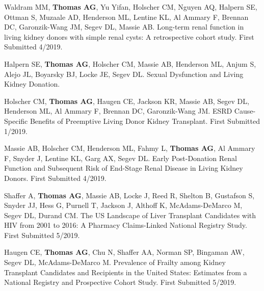 \documentclass[10pt]{article}
\renewcommand{\section}[1]{\pagebreak[3]%
    \vspace{1.3\baselineskip}%
    \phantomsection\addcontentsline{toc}{section}{#1}%
    \noindent\llap{\scshape\smash{\parbox[t]{\marginparwidth}{\hyphenpenalty=10000\raggedright #1}}}%
    \vspace{-\baselineskip}\par}
\begin{document}
\vspace{2mm}

\begin{bibenum}

\item Waldram MM\dag, \textbf{Thomas AG\dag}, Yu Yifan, Holscher CM,
  Nguyen AQ, Halpern SE, Ottman S, Muzaale AD, Henderson ML, Lentine KL,
  Al Ammary F, Brennan DC, Garonzik-Wang JM, Segev DL, Massie AB.
  Long-term renal function in living kidney donors with simple renal cysts:
  A retrospective cohort study.
  First Submitted 4/2019.

\item Halpern SE, \textbf{Thomas AG}, Holscher CM, Massie AB, Henderson ML,
  Anjum S, Alejo JL, Boyarsky BJ, Locke JE, Segev DL. Sexual Dysfunction
  and Living Kidney Donation.

\item Holscher CM\dag, \textbf{Thomas AG\dag}, Haugen CE, Jackson KR,
  Massie AB, Segev DL, Henderson ML, Al Ammary F, Brennan DC, Garonzik-Wang JM.
  ESRD Cause-Specific Benefits of Preemptive Living Donor Kidney Transplant.
  First Submitted 1/2019.

\item Massie AB, Holscher CM, Henderson ML, Fahmy L, \textbf{Thomas AG},
  Al Ammary F, Snyder J, Lentine KL, Garg AX, Segev DL.
  Early Post-Donation Renal Function and Subsequent Risk of End-Stage
  Renal Disease in Living Kidney Donors.
  First Submitted 4/2019.

\item Shaffer A, \textbf{Thomas AG}, Massie AB, Locke J, Reed R, Shelton B,
  Gustafson S, Snyder JJ, Hess G, Purnell T, Jackson J, Althoff K,
  McAdams-DeMarco M, Segev DL, Durand CM.
  The US Landscape of Liver Transplant Candidates with HIV from
  2001 to 2016: A Pharmacy Claims-Linked National Registry Study.
  First Submitted 5/2019.

\item Haugen CE\dag, \textbf{Thomas AG\dag}, Chu N, Shaffer AA, Norman SP,
  Bingaman AW, Segev DL, McAdams-DeMarco M.
  Prevalence of Frailty among Kidney Transplant Candidates and Recipients
  in the United States: Estimates from a National Registry and Prospective
  Cohort Study.
  First Submitted 5/2019.


\end{bibenum}

\end{document}

